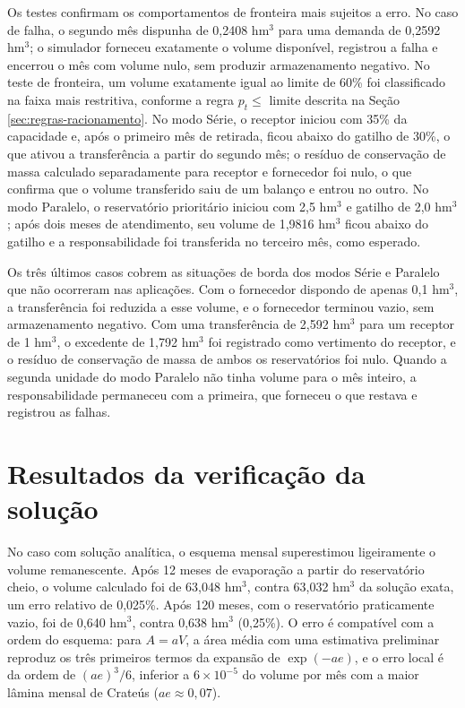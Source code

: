 Os testes confirmam os comportamentos de fronteira mais sujeitos a erro. No caso de falha, o segundo mês dispunha de 0,2408 hm$^3$ para uma demanda de 0,2592 hm$^3$; o simulador forneceu exatamente o volume disponível, registrou a falha e encerrou o mês com volume nulo, sem produzir armazenamento negativo. No teste de fronteira, um volume exatamente igual ao limite de 60\% foi classificado na faixa mais restritiva, conforme a regra $p_t \leq$ limite descrita na Seção \ref{sec:regras-racionamento}. No modo Série, o receptor iniciou com 35\% da capacidade e, após o primeiro mês de retirada, ficou abaixo do gatilho de 30\%, o que ativou a transferência a partir do segundo mês; o resíduo de conservação de massa calculado separadamente para receptor e fornecedor foi nulo, o que confirma que o volume transferido saiu de um balanço e entrou no outro. No modo Paralelo, o reservatório prioritário iniciou com 2,5 hm$^3$ e gatilho de 2,0 hm$^3$; após dois meses de atendimento, seu volume de 1,9816 hm$^3$ ficou abaixo do gatilho e a responsabilidade foi transferida no terceiro mês, como esperado.

Os três últimos casos cobrem as situações de borda dos modos Série e Paralelo que não ocorreram nas aplicações. Com o fornecedor dispondo de apenas 0,1 hm$^3$, a transferência foi reduzida a esse volume, e o fornecedor terminou vazio, sem armazenamento negativo. Com uma transferência de 2,592 hm$^3$ para um receptor de 1 hm$^3$, o excedente de 1,792 hm$^3$ foi registrado como vertimento do receptor, e o resíduo de conservação de massa de ambos os reservatórios foi nulo. Quando a segunda unidade do modo Paralelo não tinha volume para o mês inteiro, a responsabilidade permaneceu com a primeira, que forneceu o que restava e registrou as falhas.

\section{Resultados da verificação da solução}
\label{sec:resultado-solucao}

No caso com solução analítica, o esquema mensal superestimou ligeiramente o volume remanescente. Após 12 meses de evaporação a partir do reservatório cheio, o volume calculado foi de 63,048 hm$^3$, contra 63,032 hm$^3$ da solução exata, um erro relativo de 0,025\%. Após 120 meses, com o reservatório praticamente vazio, foi de 0,640 hm$^3$, contra 0,638 hm$^3$ (0,25\%). O erro é compatível com a ordem do esquema: para $A = aV$, a área média com uma estimativa preliminar reproduz os três primeiros termos da expansão de $\exp(-ae)$, e o erro local é da ordem de $(ae)^3/6$, inferior a $6 \times 10^{-5}$ do volume por mês com a maior lâmina mensal de Crateús ($ae \approx 0{,}07$).

